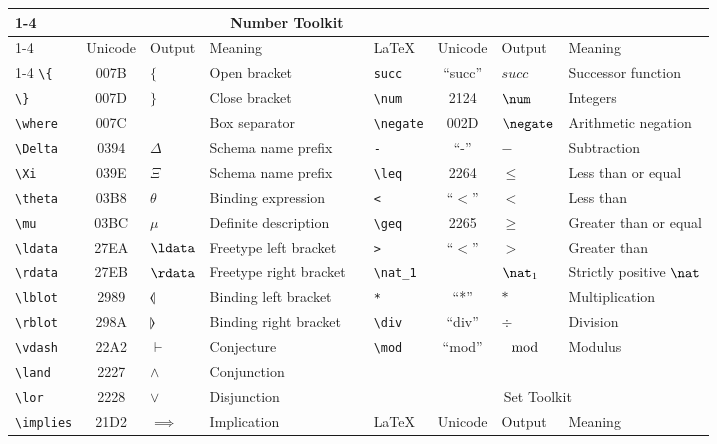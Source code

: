 \begin{tabular}{lcllllcll}
\cline{1-4}\cline{6-9}
\multicolumn{4}{|c|}{Prelude} & \multicolumn{1}{l|}{} & \multicolumn{4}{c|}{Number Toolkit} \\
\cline{1-4}\cline{6-9}
\multicolumn{1}{|l|}{\LaTeX} & \multicolumn{1}{c|}{Unicode} & \multicolumn{1}{l|}{Output} & \multicolumn{1}{l|}{Meaning} & \multicolumn{1}{l|}{} & \multicolumn{1}{l|}{\LaTeX} & \multicolumn{1}{c|}{Unicode} & \multicolumn{1}{l|}{Output} & \multicolumn{1}{l|}{Meaning} \\
\cline{1-4}\cline{6-9}
\verb'\{' & 007B & $\{$ & Open bracket &  & \verb'succ' & ``succ'' & $succ$ & Successor function \\
\verb'\}' & 007D & $\}$ & Close bracket &  & \verb'\num' & 2124 & $\num$ & Integers \\
\verb'\where' & 007C &  & Box separator &  & \verb'\negate' & 002D & $\negate$ & Arithmetic negation \\
\verb'\Delta' & 0394 & $\Delta$ & Schema name prefix &  & \verb'-' & ``-'' & $-$ & Subtraction \\
\verb'\Xi' & 039E & $\Xi$ & Schema name prefix &  & \verb'\leq' & 2264 & $\leq$ & Less than or equal \\
\verb'\theta' & 03B8 & $\theta$ & Binding expression &  & \verb'<' & ``$<$'' & $<$ & Less than \\
\verb'\mu' & 03BC & $\mu$ & Definite description &  & \verb'\geq' & 2265 & $\geq$ & Greater than or equal \\
\verb'\ldata' & 27EA & $\ldata$ & Freetype left bracket &  & \verb'>' & ``$<$'' & $>$ & Greater than \\
\verb'\rdata' & 27EB & $\rdata$ & Freetype right bracket &  & \verb'\nat_1' &  & $\nat_1$ & Strictly positive $\nat$ \\
\verb'\lblot' & 2989 & $\lblot$ & Binding left bracket &  & \verb'*' & ``*'' & $*$ & Multiplication \\
\verb'\rblot' & 298A & $\rblot$ & Binding right bracket &  & \verb'\div ' & ``div'' & $\div$ & Division \\
\verb'\vdash'  & 22A2 & $\vdash$ & Conjecture &  & \verb'\mod' & ``mod'' & $\mod$ & Modulus \\
\verb'\land' & 2227 & $\land$ & Conjunction &  &  &  &  &  \\
\verb'\lor' & 2228 & $\lor$ & Disjunction &  & \multicolumn{4}{c}{Set Toolkit} \\
\verb'\implies' & 21D2 & $\implies$ & Implication &  & \LaTeX & Unicode & Output & Meaning \\

\end{tabular}
